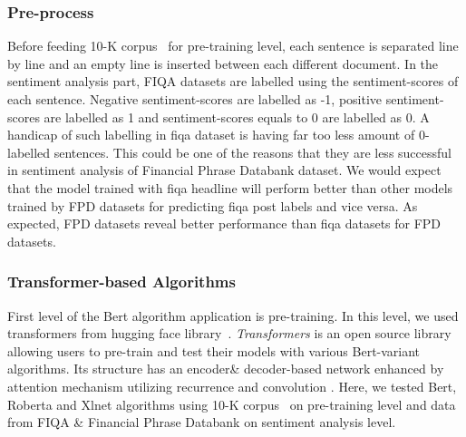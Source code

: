 \documentclass[11pt]{article}
\begin{document}
\subsubsection{Pre-process}
Before feeding 10-K corpus~\cite{kogan2009} for pre-training level, each sentence is separated line by line and  an empty line is inserted between each different document.
\newline
In the sentiment analysis part, FIQA datasets are labelled using the sentiment-scores of each sentence. Negative sentiment-scores are labelled as -1, positive sentiment-scores are labelled as 1 and sentiment-scores equals to 0 are labelled as 0. 
\newline
A handicap of such labelling in fiqa dataset is having far too less amount of 0-labelled sentences. This could be one of the reasons that they are less successful in sentiment analysis of Financial Phrase Databank dataset. We would expect that the model trained with fiqa headline will perform better than other models trained by FPD datasets for predicting fiqa post labels and vice versa.  As expected, FPD datasets reveal better performance than fiqa datasets for FPD datasets. 
\subsubsection{Transformer-based Algorithms}
First level of the Bert algorithm application is pre-training. In this level, we used transformers from hugging face library~\cite{wolf2019huggingface}. \textit{Transformers} is an open source library allowing users to pre-train and test their models with various Bert-variant algorithms. Its structure has an encoder\& decoder-based network enhanced by attention mechanism utilizing recurrence and convolution \cite{vaswani2017attention}.  
\newline Here, we tested Bert, Roberta and Xlnet algorithms using 10-K corpus~\cite{kogan2009} on pre-training level and data from FIQA \& Financial Phrase Databank on sentiment analysis level.



\end{document}
